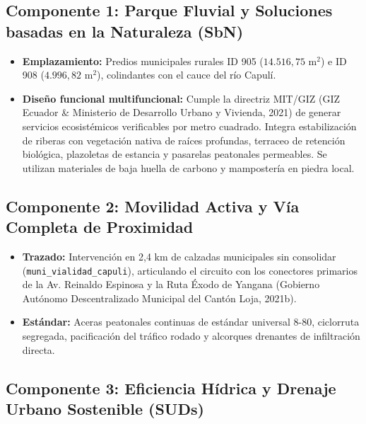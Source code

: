 \documentclass[
  spanish,
  letterpaper,
  DIV=11,
  numbers=noendperiod]{scrartcl}
\providecommand{\tightlist}{%
  \setlength{\itemsep}{0pt}\setlength{\parskip}{0pt}}
\begin{document}
\subsection{Componente 1: Parque Fluvial y Soluciones basadas en la
Naturaleza
(SbN)}\label{componente-1-parque-fluvial-y-soluciones-basadas-en-la-naturaleza-sbn}

\begin{itemize}
\tightlist
\item
  \textbf{Emplazamiento:} Predios municipales rurales ID 905
  (\(14.516,75 \text{ m}^2\)) e ID 908 (\(4.996,82 \text{ m}^2\)),
  colindantes con el cauce del río Capulí.
\item
  \textbf{Diseño funcional multifuncional:} Cumple la directriz MIT/GIZ
  (GIZ Ecuador \& Ministerio de Desarrollo Urbano y Vivienda, 2021) de
  generar servicios ecosistémicos verificables por metro cuadrado.
  Integra estabilización de riberas con vegetación nativa de raíces
  profundas, terraceo de retención biológica, plazoletas de estancia y
  pasarelas peatonales permeables. Se utilizan materiales de baja huella
  de carbono y mampostería en piedra local.
\end{itemize}

\subsection{Componente 2: Movilidad Activa y Vía Completa de
Proximidad}\label{componente-2-movilidad-activa-y-vuxeda-completa-de-proximidad}

\begin{itemize}
\tightlist
\item
  \textbf{Trazado:} Intervención en 2,4 km de calzadas municipales sin
  consolidar (\texttt{muni\_vialidad\_capuli}), articulando el circuito
  con los conectores primarios de la Av. Reinaldo Espinosa y la Ruta
  Éxodo de Yangana (Gobierno Autónomo Descentralizado Municipal del
  Cantón Loja, 2021b).
\item
  \textbf{Estándar:} Aceras peatonales continuas de estándar universal
  8-80, ciclorruta segregada, pacificación del tráfico rodado y
  alcorques drenantes de infiltración directa.
\end{itemize}

\subsection{Componente 3: Eficiencia Hídrica y Drenaje Urbano Sostenible
(SUDs)}\label{componente-3-eficiencia-huxeddrica-y-drenaje-urbano-sostenible-suds}
\end{document}

